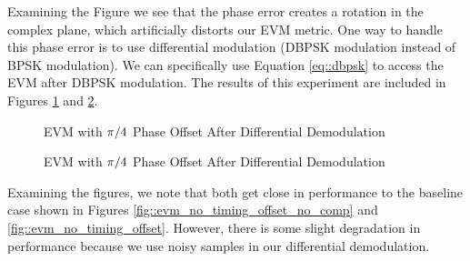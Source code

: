 \documentclass{article}
\begin{document}
\noindent Examining the Figure we see that the phase error creates a rotation in the complex plane, which artificially distorts our EVM metric. One way to handle this phase error is to use differential modulation (DBPSK modulation instead of BPSK modulation). We can specifically use Equation \ref{eq::dbpsk} to access the EVM after DBPSK modulation. The results of this experiment are included in Figures \ref{fig::evm_dpsk_modulation_no_comp} and \ref{fig::evm_dpsk_modulation}.

\begin{figure}[H]
	\centerline{}
	\caption{EVM with $\protect\pi/4$ Phase Offset After Differential Demodulation}
	\label{fig::evm_dpsk_modulation_no_comp}
\end{figure}

\begin{figure}[H]
	\centerline{}
	\caption{EVM with $\protect\pi/4$ Phase Offset After Differential Demodulation}
	\label{fig::evm_dpsk_modulation}
\end{figure}

\noindent Examining the figures, we note that both get close in performance to the baseline case shown in Figures \ref{fig::evm_no_timing_offset_no_comp} and \ref{fig::evm_no_timing_offset}. However, there is some slight degradation in performance because we use noisy samples in our differential demodulation. 
\end{document}
